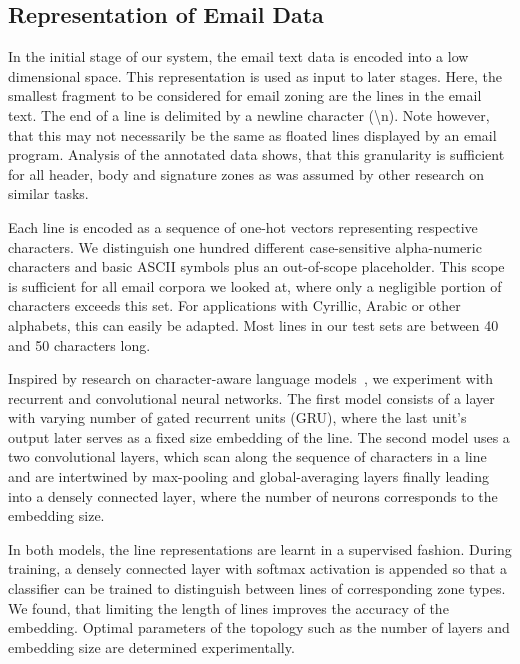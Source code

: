 \documentclass{llncs}
\begin{document}
\subsection{Representation of Email Data}
In the initial stage of our system, the email text data is encoded into a low dimensional space.
This representation is used as input to later stages.
Here, the smallest fragment to be considered for email zoning are the lines in the email text.
The end of a line is delimited by a newline character (\textbackslash n).
Note however, that this may not necessarily be the same as floated lines displayed by an email program.
Analysis of the annotated data shows, that this granularity is sufficient for all header, body and signature zones as was assumed by other research on similar tasks.

Each line is encoded as a sequence of one-hot vectors representing respective characters.
We distinguish one hundred different case-sensitive alpha-numeric characters and basic ASCII symbols plus an out-of-scope placeholder.
This scope is sufficient for all email corpora we looked at, where only a negligible portion of characters exceeds this set.
For applications with Cyrillic, Arabic or other alphabets, this can easily be adapted.
Most lines in our test sets are between 40 and 50 characters long.

Inspired by research on character-aware language models~\cite{char_nn}, we experiment with recurrent and convolutional neural networks.
The first model consists of a layer with varying number of gated recurrent units (GRU), where the last unit's output later serves as a fixed size embedding of the line.
The second model uses a two convolutional layers, which scan along the sequence of characters in a line and are intertwined by max-pooling and global-averaging layers finally leading into a densely connected layer, where the number of neurons corresponds to the embedding size.

In both models, the line representations are learnt in a supervised fashion.
During training, a densely connected layer with softmax activation is appended so that a classifier can be trained to distinguish between lines of corresponding zone types.
We found, that limiting the length of lines improves the accuracy of the embedding.
Optimal parameters of the topology such as the number of layers and embedding size are determined experimentally.


\end{document}
